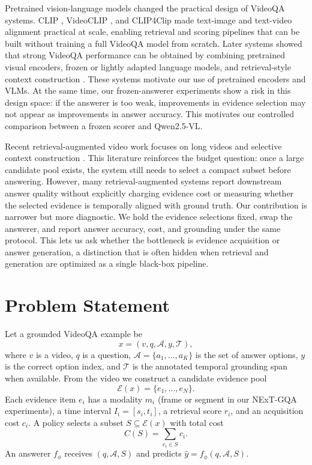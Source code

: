 \documentclass{article}
\begin{document}
Pretrained vision-language models changed the practical design of VideoQA systems. CLIP \citep{radford2021clip}, VideoCLIP \citep{xu2021videoclip}, and CLIP4Clip \citep{luo2021clip4clip} made text-image and text-video alignment practical at scale, enabling retrieval and scoring pipelines that can be built without training a full VideoQA model from scratch. Later systems showed that strong VideoQA performance can be obtained by combining pretrained visual encoders, frozen or lightly adapted language models, and retrieval-style context construction \citep{yang2021justask,yang2022frozenbilm,pan2023r2a}. These systems motivate our use of pretrained encoders and VLMs. At the same time, our frozen-answerer experiments show a risk in this design space: if the answerer is too weak, improvements in evidence selection may not appear as improvements in answer accuracy. This motivates our controlled comparison between a frozen scorer and Qwen2.5-VL.

Recent retrieval-augmented video work focuses on long videos and selective context construction \citep{luo2024videorag,gia2025vrag}. This literature reinforces the budget question: once a large candidate pool exists, the system still needs to select a compact subset before answering. However, many retrieval-augmented systems report downstream answer quality without explicitly charging evidence cost or measuring whether the selected evidence is temporally aligned with ground truth. Our contribution is narrower but more diagnostic. We hold the evidence selections fixed, swap the answerer, and report answer accuracy, cost, and grounding under the same protocol. This lets us ask whether the bottleneck is evidence acquisition or answer generation, a distinction that is often hidden when retrieval and generation are optimized as a single black-box pipeline.

\section{Problem Statement}
Let a grounded VideoQA example be
\[
  x = (v, q, \mathcal{A}, y, \mathcal{T}),
\]
where $v$ is a video, $q$ is a question, $\mathcal{A}=\{a_1,\ldots,a_K\}$ is the set of answer options, $y$ is the correct option index, and $\mathcal{T}$ is the annotated temporal grounding span when available. From the video we construct a candidate evidence pool
\[
  \mathcal{E}(x)=\{e_1,\ldots,e_N\}.
\]
Each evidence item $e_i$ has a modality $m_i$ (frame or segment in our NExT-GQA experiments), a time interval $I_i=[s_i,t_i]$, a retrieval score $r_i$, and an acquisition cost $c_i$. A policy selects a subset $S \subseteq \mathcal{E}(x)$ with total cost
\[
  C(S)=\sum_{e_i \in S} c_i.
\]
An answerer $f_\phi$ receives $(q,\mathcal{A},S)$ and predicts $\hat{y}=f_\phi(q,\mathcal{A},S)$.
\end{document}
